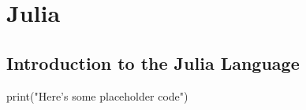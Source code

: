 \section{Julia}

\subsection{Introduction to the Julia Language}

\begin{jllisting}[language=julia, style=jlcodestyle]
    print("Here's some placeholder code")
\end{jllisting}